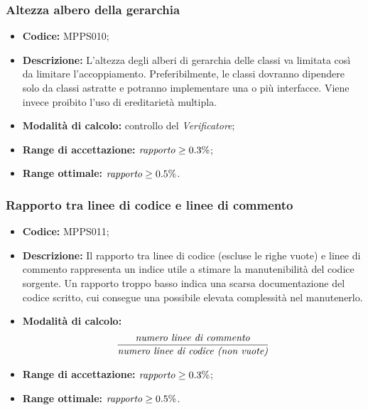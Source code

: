 \documentclass[../NormediProgetto.tex]{subfiles}
\begin{document}
\subsubsection{Altezza albero della gerarchia}

\begin{itemize}
	
	\item \textbf{Codice:} MPPS010;
	
	\item \textbf{Descrizione:} L'altezza degli alberi di gerarchia delle classi va limitata così da limitare l'accoppiamento. Preferibilmente, le classi dovranno dipendere solo da classi astratte e potranno implementare una o più interfacce. Viene invece proibito l'uso di ereditarietà multipla.
	
	\item \textbf{Modalità di calcolo:} controllo del \textit{Verificatore};
	
	\item \textbf{Range di accettazione:} $ \textrm{\textit{rapporto}} \geq 0.3\% $;
	
	\item \textbf{Range ottimale:} $ \textrm{\textit{rapporto}} \geq 0.5\% $.
\end{itemize}

\subsubsection{Rapporto tra linee di codice e linee di commento}

\begin{itemize}
	
	\item \textbf{Codice:} MPPS011;
	
	\item \textbf{Descrizione:} Il rapporto tra linee di codice (escluse le righe vuote) e linee di commento rappresenta un indice utile a stimare la manutenibilità del codice sorgente. Un rapporto troppo basso indica una scarsa documentazione del codice scritto, cui consegue una possibile elevata complessità nel manutenerlo.
	
	\item \textbf{Modalità di calcolo:}
	\[\frac{\textrm{\textit{numero linee di commento}}}{\textrm{\textit{numero linee di codice (non vuote)}}} \]
	
	\item \textbf{Range di accettazione:} $ \textrm{\textit{rapporto}} \geq 0.3\% $;
	
	\item \textbf{Range ottimale:} $ \textrm{\textit{rapporto}} \geq 0.5\% $.
\end{itemize}

\end{document}
